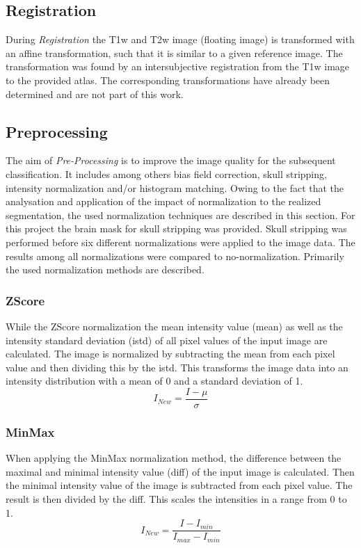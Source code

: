 \documentclass[journal]{IEEEtran}
\begin{document}
\subsection{Registration}
	During {\itshape Registration} the T1w and T2w image (floating image) is transformed with an affine transformation, such that it is similar to a given reference image.
	The transformation was found by an intersubjective registration from the T1w image to the provided atlas. The corresponding transformations have already been determined
	and are not part of this work. 	
	
\subsection{Preprocessing}
	The aim of {\itshape Pre-Processing} is to improve the image quality for the subsequent classification. It includes among others bias field correction, skull stripping, intensity normalization and/or histogram matching.
	Owing to the fact that the analysation and application of the impact of normalization to the realized segmentation, the used normalization techniques are described in this section.
	For this project the brain mask for skull stripping was provided. Skull stripping was performed before six different normalizations were applied to the image data. The results among all normalizations were compared to no-normalization. Primarily the used normalization methods are described. \cite{normalizations} \smallskip
		
	\subsubsection{ZScore}
	While the ZScore normalization the mean intensity value (mean) as well as the intensity standard deviation (istd) of all pixel values of the input image are calculated. 
	The image is normalized by subtracting the mean from each pixel value and then dividing this by the istd.
	This transforms the image data into an intensity distribution with a mean of 0 and a standard deviation of 1.
		\begin{equation}\label{ZScore}
			I_{New} = \frac{I - \mu}{\sigma}
		\end{equation}
			
	\subsubsection{MinMax}
	When applying the MinMax normalization method, the difference between the maximal and minimal intensity value (diff) of the input image is calculated. 
	Then the minimal intensity value of the image is subtracted from each pixel value. The result is then divided by the diff.
	This scales the intensities in a range from 0 to 1. 
		\begin{equation}
			I_{New} = \frac{I - I_{min}}{I_{max} - I_{min}}
		\end{equation}
		
\end{document}
